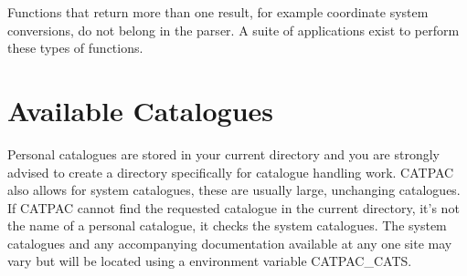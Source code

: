 Functions that return more than one result, for example coordinate system
conversions, do not belong in the parser. A suite of applications exist
to perform these types of functions.

\section{Available Catalogues}
\label{ap:cats}

Personal catalogues are stored in your current directory and you are strongly
advised to create a directory specifically for catalogue handling work. CATPAC
also allows for system catalogues, these are usually large, unchanging
catalogues. If CATPAC cannot find the requested catalogue in the current
directory, it's not the name of a personal catalogue, it checks the system
catalogues. The system catalogues and any accompanying documentation available
at any one site may vary but will be located using a environment variable
CATPAC\_CATS.


